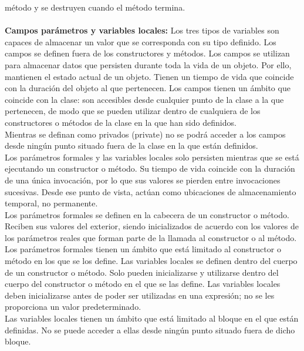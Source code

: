 \documentclass[11pt,a4paper]{article}
\begin{document}
	método y se destruyen cuando el método termina.\\
	\\
	\textbf{Campos parámetros y variables locales:} Los tres tipos de variables son capaces de almacenar un valor que se corresponda con su
	tipo definido. Los campos se definen fuera de los constructores y métodos. Los campos se utilizan para almacenar datos que persisten durante toda la vida de un objeto.
	Por ello, mantienen el estado actual de un objeto. Tienen un tiempo de vida que coincide con la
	duración del objeto al que pertenecen. Los campos tienen un ámbito que coincide con la clase: son accesibles desde cualquier punto de
	la clase a la que pertenecen, de modo que se pueden utilizar dentro de cualquiera de los constructores
	o métodos de la clase en la que han sido definidos.\\
	Mientras se definan como privados (private) no se podrá acceder a los campos desde ningún
	punto situado fuera de la clase en la que están definidos.\\
	Los parámetros formales y las variables locales solo persisten mientras que se está ejecutando
	un constructor o método. Su tiempo de vida coincide con la duración de una única invocación,
	por lo que sus valores se pierden entre invocaciones sucesivas. Desde ese punto de vista, actúan
	como ubicaciones de almacenamiento temporal, no permanente.\\
	Los parámetros formales se definen en la cabecera de un constructor o método. Reciben sus
	valores del exterior, siendo inicializados de acuerdo con los valores de los parámetros reales que
	forman parte de la llamada al constructor o al método. Los parámetros formales tienen un ámbito que está limitado al constructor o método en los que
	se los define.
	Las variables locales se definen dentro del cuerpo de un constructor o método. Solo pueden
	inicializarse y utilizarse dentro del cuerpo del constructor o método en el que se las define.
	Las variables locales deben inicializarse antes de poder ser utilizadas en una expresión; no se les
	proporciona un valor predeterminado.\\
	Las variables locales tienen un ámbito que está limitado al bloque en el que están definidas. No
	se puede acceder a ellas desde ningún punto situado fuera de dicho bloque.
\end{document}
